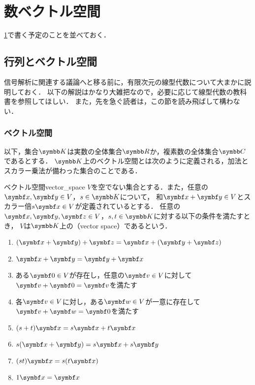 \documentclass[../../main]{subfiles}
\begin{document}
\chapter{数ベクトル空間}
\label{chapter:numerical_vector_space}

\begin{lead}
  \cref{chapter:numerical_vector_space}で書く予定のことを並べておく．
\end{lead}

\section{行列とベクトル空間}
信号解析に関連する議論へと移る前に，有限次元の線型代数について大まかに説明しておく．
以下の解説はかなり大雑把なので，必要に応じて線型代数の教科書を参照してほしい．
また，先を急ぐ読者は，この節を読み飛ばして構わない．

\subsection{ベクトル空間}
以下，集合\(\numset{K}\)は実数の全体集合\(\numset{R}\)か，複素数の全体集合\(\numset{C}\)であるとする．
\(\numset{K}\)上のベクトル空間とは次のように定義される，加法とスカラー乗法が備わった集合のことである．

\begin{definition}{ベクトル空間}{vector_space}
  \(V\)を空でない集合とする．また，任意の\(\vect{x},\vect{y}\in V\)，\(s\in\numset{K}\)について，
  和\(\vect{x}+\vect{y}\in V\)とスカラー倍\(s\vect{x}\in V\)が定義されているとする．
  任意の\(\vect{x},\vect{y},\vect{z}\in V\)，\(s,t\in\numset{K}\)に対する以下の条件を満たすとき，
  \(V\)は\(\numset{K}\)上の（vector space）であるという．

  \begin{enumerate}
    \item \((\vect{x}+\vect{y})+\vect{z}=\vect{x}+(\vect{y}+\vect{z})\)
    \item \(\vect{x}+\vect{y}=\vect{y}+\vect{x}\)
    \item ある\(\zvec\in V\)が存在し，任意の\(\vect{v}\in V\)に対して\(\vect{v}+\zvec=\vect{v}\)を満たす
    \item 各\(\vect{v}\in V\)に対し，ある\(\vect{w}\in V\)が一意に存在して\(\vect{v}+\vect{w}=\zvec\)を満たす
    \item \((s+t)\vect{x}=s\vect{x}+t\vect{x}\)
    \item \(s(\vect{x}+\vect{y})=s\vect{x}+s\vect{y}\)
    \item \((st)\vect{x}=s(t\vect{x})\)
    \item \(1\vect{x}=\vect{x}\)
  \end{enumerate}
\end{definition}
\end{document}
